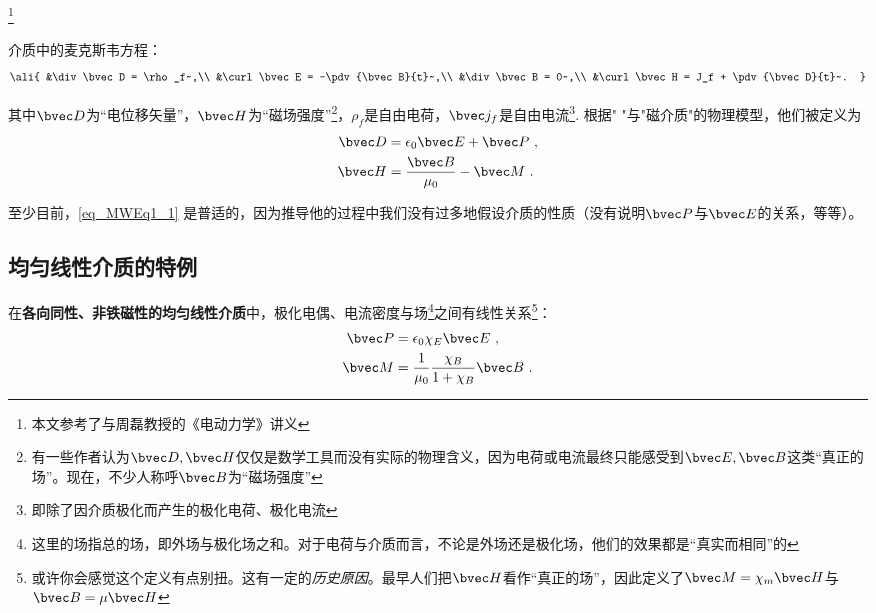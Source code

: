 
\footnote{本文参考了\cite{GriffE}与周磊教授的《电动力学》讲义}
\begin{issues}
\issueDraft
\end{issues}

介质中的麦克斯韦方程：
\begin{equation}\label{eq_MWEq1_1}\ali{
&\div\bvec D = \rho_f~,\\
&\curl\bvec E = -\pdv{\bvec B}{t}~,\\
&\div\bvec B = 0~,\\
&\curl\bvec H = J_f + \pdv{\bvec D}{t}~.
}\end{equation}

其中$\bvec D$为“电位移矢量”，$\bvec H$为“磁场强度”\footnote{有一些作者认为$\bvec D, \bvec H$仅仅是数学工具而没有实际的物理含义，因为电荷或电流最终只能感受到$\bvec E, \bvec B$这类“真正的场”。现在，不少人称呼$\bvec B$为“磁场强度”}，$\rho_f$是自由电荷，$\bvec j_f$是自由电流\footnote{即除了因介质极化而产生的极化电荷、极化电流}. 根据" "与"磁介质"的物理模型，他们被定义为
\begin{align}
\bvec D &= \epsilon_0 \bvec E + \bvec P~,\\
\bvec H &= \frac{\bvec B}{\mu_0} - \bvec M~.\\
\end{align}

至少目前，\autoref{eq_MWEq1_1} 是普适的，因为推导他的过程中我们没有过多地假设介质的性质（没有说明$\bvec P$与$\bvec E$的关系，等等）。

\subsection{均匀线性介质的特例}
在\textbf{各向同性、非铁磁性的均匀线性介质}中，极化电偶、电流密度与场\footnote{这里的场指总的场，即外场与极化场之和。对于电荷与介质而言，不论是外场还是极化场，他们的效果都是“真实而相同”的}之间有线性关系\footnote{或许你会感觉这个定义有点别扭。这有一定的\textsl{历史原因}。最早人们把$\bvec H$看作“真正的场”，因此定义了$\bvec M = \chi_m \bvec H$与$\bvec B = \mu \bvec H$}：
\begin{align}
\bvec P &= \epsilon_0 \chi_E \bvec E~,\\
\bvec M &= \frac{1}{\mu_0} \frac{\chi_B}{1+\chi_B}\bvec B~.\\
\end{align}

